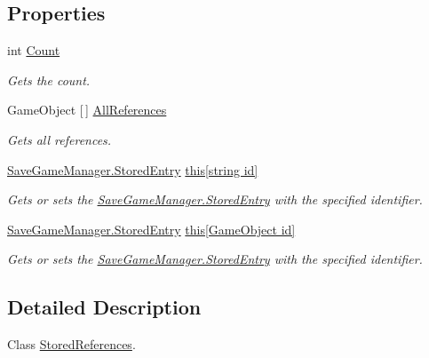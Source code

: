 \subsection*{Properties}
\begin{DoxyCompactItemize}
\item 
int \hyperlink{class_stored_references_ab5db5e62d48b445e7c51d4c88e640aa9}{Count}
\begin{DoxyCompactList}\small\item\em Gets the count. \end{DoxyCompactList}\item 
Game\+Object \mbox{[}$\,$\mbox{]} \hyperlink{class_stored_references_a6f87654d72a192e9d0d98c1633c67358}{All\+References}
\begin{DoxyCompactList}\small\item\em Gets all references. \end{DoxyCompactList}\item 
\hyperlink{class_save_game_manager_1_1_stored_entry}{Save\+Game\+Manager.\+Stored\+Entry} \hyperlink{class_stored_references_ab8dc5c6dbac10be877b2f347dbfbf2ec}{this\mbox{[}string id\mbox{]}}
\begin{DoxyCompactList}\small\item\em Gets or sets the \hyperlink{class_save_game_manager_1_1_stored_entry}{Save\+Game\+Manager.\+Stored\+Entry} with the specified identifier. \end{DoxyCompactList}\item 
\hyperlink{class_save_game_manager_1_1_stored_entry}{Save\+Game\+Manager.\+Stored\+Entry} \hyperlink{class_stored_references_a01fd40bb59a909c460f5d08a5adae4c9}{this\mbox{[}\+Game\+Object id\mbox{]}}
\begin{DoxyCompactList}\small\item\em Gets or sets the \hyperlink{class_save_game_manager_1_1_stored_entry}{Save\+Game\+Manager.\+Stored\+Entry} with the specified identifier. \end{DoxyCompactList}\end{DoxyCompactItemize}


\subsection{Detailed Description}
Class \hyperlink{class_stored_references}{Stored\+References}. 



